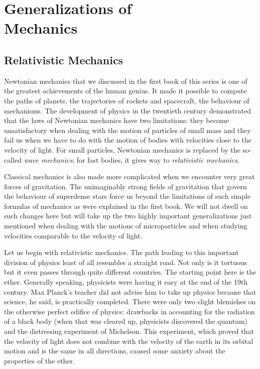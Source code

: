 

\cleardoublepage
\chapter[Generalizations of Mechanics]{Generalizations of \\Mechanics}
\label{ch-04}

\section{Relativistic Mechanics}

Newtonian mechanics that we discussed in the first book of this series is one of the greatest achievements of the human genius. It made it possible to compute the paths of planets, the trajectories of rockets and spacecraft, the behaviour of mechanisms. The development of phys­ics in the twentieth century demonstrated that the laws of Newtonian mechanics have two limitations: they be­come unsatisfactory when dealing with the motion of particles of small mass and they fail us when we have to do with the motion of bodies with velocities close to the velocity of light. For small particles, Newtonian mechanics is replaced by the so-called \emph{wave mechanics}; for fast bodies, it gives way to \emph{relativistic mechanics}.

Classical mechanics is also made more complicated when we encounter very great forces of gravitation. The unimaginably strong fields of gravitation that govern the behaviour of superdense stars force us beyond the limita­tions of such simple formulas of mechanics as were ex­plained in the first book. We will not dwell on such changes here but will take up the two highly important generalizations just mentioned when dealing with the motions of microparticles and when studying velocities comparable to the velocity of light.

Let us begin with relativistic mechanics. The path leading to this important division of physics least of all resembles a straight road. Not only is it tortuous but it even passes through quite different countries. The starting point here is the ether. Generally speaking, physicists were having it easy at the end of the 19th century. Max Planck's teacher did not advise him to take up physics because that science, he said, is practically completed. There were only two slight blemishes on the otherwise perfect edifice of physics: drawbacks in accounting for the radiation of a black body (when that was cleared up, physicists discovered the quantum) and the distressing experiment of Michelson. This experiment, which proved that the velocity of light does not combine with the velocity of the earth in its orbital motion and is the same in all directions, caused some anxiety about the properties of the ether.


